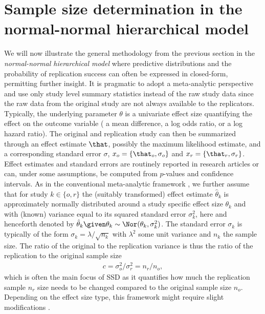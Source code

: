 \section{Sample size determination in the normal-normal hierarchical model}
\label{sec:SS}
We will now illustrate the general methodology from the previous section in the
\emph{normal-normal hierarchical model} where predictive distributions and the
probability of replication success can often be expressed in closed-form,
permitting further insight. %
It is pragmatic to adopt a meta-analytic perspective and use only study level
summary statistics instead of the raw study data since the raw data from the
original study are not always available to the replicators. Typically, the
underlying parameter $\theta$ is a univariate effect size quantifying the effect
on the outcome variable (\eg{} a mean difference, a log odds ratio, or a log
hazard ratio). The original and replication study can then be summarized through
an effect estimate $\that$, possibly the maximum likelihood estimate, and a
corresponding standard error $\sigma$, \ie{} $x_{o} = \{\that_{o}, \sigma_{o}\}$
and $x_{r} = \{\that_{r}, \sigma_{r}\}$. Effect estimates and standard errors
are routinely reported in research articles or can, under some assumptions, be
computed from $p$-values and confidence intervals. As in the conventional
meta-analytic framework \citep{Sutton2001}, we further assume that for study
$k \in \{o, r\}$ the (suitably transformed) effect estimate $\hat{\theta}_k$ is
approximately normally distributed around a study specific effect size
$\theta_k$ and with (known) variance equal to its squared standard error
$\sigma_k^2$, here and henceforth denoted by
$\hat{\theta}_k \given \theta_k \sim \Nor(\theta_k, \sigma_k^2)$. The standard
error $\sigma_k$ is typically of the form $\sigma_k = \lambda/\sqrt{n_k}$ with
$\lambda^{2}$ some unit variance and $n_{k}$ the sample size. The ratio of the
original to the replication variance is thus the ratio of the replication to the
original sample size
\begin{align*}
  c = \sigma^2_o/\sigma^2_r = n_r/n_o,
\end{align*}
which is often the main focus of SSD as it quantifies how much the replication
sample $n_{r}$ size needs to be changed compared to the original sample size
$n_{o}$. Depending on the effect size type, this framework might require slight
modifications \citep[see \eg{}][ch. 2.4]{Spiegelhalter2004}.


